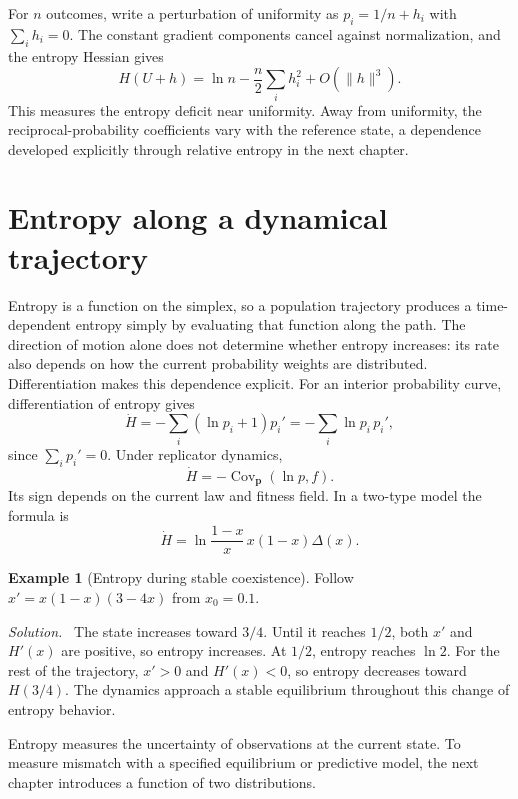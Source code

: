 \documentclass[11pt,oneside,openany]{book}
\theoremstyle{definition}
\newtheorem{example}{Example}[chapter]
\theoremstyle{remark}
\newenvironment{solution}{\par\smallskip\noindent\textit{Solution.}\ }{\par\smallskip}
\newcommand{\Cov}{\operatorname{Cov}}
\newcommand{\p}{\mathbf{p}}
\numberwithin{equation}{chapter}
\begin{document}
For $n$ outcomes, write a perturbation of uniformity as $p_i=1/n+h_i$ with $\sum_i h_i=0$. The constant gradient components cancel against normalization, and the entropy Hessian gives
\[
H(U+h)=\ln n-\frac n2\sum_i h_i^2+O(\|h\|^3).
\]
This measures the entropy deficit near uniformity. Away from uniformity, the reciprocal-probability coefficients vary with the reference state, a dependence developed explicitly through relative entropy in the next chapter.

\section{Entropy along a dynamical trajectory}
Entropy is a function on the simplex, so a population trajectory produces a time-dependent entropy simply by evaluating that function along the path. The direction of motion alone does not determine whether entropy increases: its rate also depends on how the current probability weights are distributed. Differentiation makes this dependence explicit.
For an interior probability curve, differentiation of entropy gives
\[
\dot H=-\sum_i(\ln p_i+1)p_i'=-\sum_i\ln p_i\,p_i',
\]
since $\sum_i p_i'=0$. Under replicator dynamics,
\begin{equation}\label{eq:entropyrate}
\dot H=-\Cov_\p(\ln p,f).
\end{equation}
Its sign depends on the current law and fitness field. In a two-type model the formula is
\[
\dot H=\ln\frac{1-x}{x}\,x(1-x)\Delta(x).
\]

\begin{example}[Entropy during stable coexistence]
Follow $x'=x(1-x)(3-4x)$ from $x_0=0.1$.
\begin{solution}
The state increases toward $3/4$. Until it reaches $1/2$, both $x'$ and $H'(x)$ are positive, so entropy increases. At $1/2$, entropy reaches $\ln2$. For the rest of the trajectory, $x'>0$ and $H'(x)<0$, so entropy decreases toward $H(3/4)$. The dynamics approach a stable equilibrium throughout this change of entropy behavior.
\end{solution}
\end{example}

Entropy measures the uncertainty of observations at the current state. To measure mismatch with a specified equilibrium or predictive model, the next chapter introduces a function of two distributions.

\FloatBarrier
\end{document}
